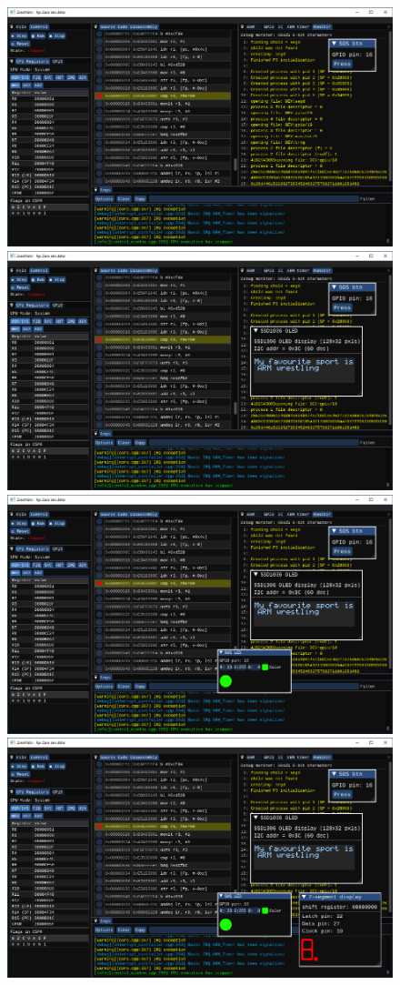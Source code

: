 \documentclass[compress]{beamer}
\begin{document}
\begin{frame}
	\centering \Large
	\begin{overlayarea}{\textwidth}{\textheight}
		\begin{figure}
			\centering
			{%
				\includegraphics[width=.85\textwidth]{img/screenshot-02.pdf}%
			}%
			\only<2>
			{%
				\includegraphics[width=.85\textwidth]{img/screenshot-03.pdf}%
			}%
			\only<3>
			{%
				\includegraphics[width=.85\textwidth]{img/screenshot-04.pdf}%
			}%
			\only<4>
			{%
				\includegraphics[width=.85\textwidth]{img/screenshot-05.pdf}%
}
\end{figure}
\end{overlayarea}
\end{frame}
\end{document}
